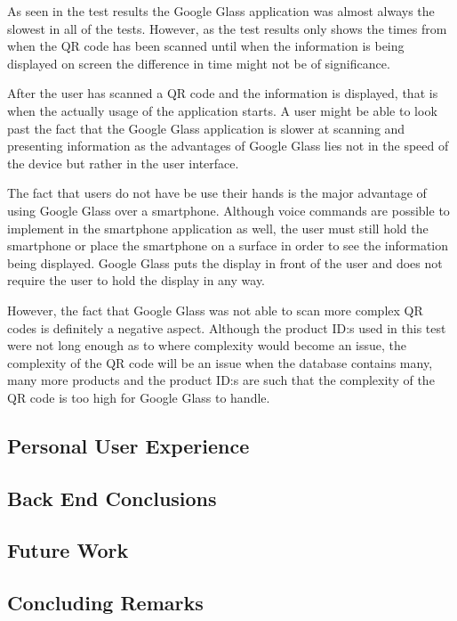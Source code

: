 As seen in the test results the Google Glass application was almost always the slowest in all of the tests. However, as the test results only shows the times from when the QR code has been scanned until when the information is being displayed on screen the difference in time might not be of significance. 

After the user has scanned a QR code and the information is displayed, that is when the actually usage of the application starts. A user might be able to look past the fact that the Google Glass application is slower at scanning and presenting information as the advantages of Google Glass lies not in the speed of the device but rather in the user interface.

The fact that users do not have be use their hands is the major advantage of using Google Glass over a smartphone. Although voice commands are possible to implement in the smartphone application as well, the user must still hold the smartphone or place the smartphone on a surface in order to see the information being displayed. Google Glass puts the display in front of the user and does not require the user to hold the display in any way.

However, the fact that Google Glass was not able to scan more complex QR codes is definitely a negative aspect. Although the product ID:s used in this test were not long enough as to where complexity would become an issue, the complexity of the QR code will be an issue when the database contains many, many more products and the product ID:s are such that the complexity of the QR code is too high for Google Glass to handle.


\subsection{Personal User Experience}
\label{subsec:personalexperience}


\subsection{Back End Conclusions}

\subsection{Future Work}
\label{subsec:futurework}


\subsection{Concluding Remarks}